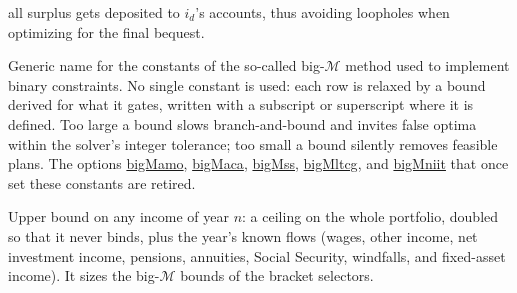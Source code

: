 \documentclass[fleqn,12pt]{report}
\newcommand{\code}[1]{\url{#1}}
\begin{document}
\begin{description}[leftmargin=4em,style=multiline]
	all surplus gets deposited to $i_d$'s accounts,
	thus avoiding loopholes when optimizing for the final bequest.
\item[$\mathcal{M}$]
	Generic name for the constants of the so-called big-$\mathcal{M}$ method used to implement
	binary constraints. No single constant is used: each row is relaxed by a bound derived for
	what it gates, written with a subscript or superscript where it is defined.
	Too large a bound slows branch-and-bound and invites false optima within the solver's
	integer tolerance; too small a bound silently removes feasible plans.
	The options \code{bigMamo}, \code{bigMaca}, \code{bigMss}, \code{bigMltcg}, and
	\code{bigMniit} that once set these constants are retired.
\item[$\bar{\mathcal{C}}_n$]
	Upper bound on any income of year $n$: a ceiling on the whole portfolio, doubled so that it
	never binds, plus the year's known flows (wages, other income, net investment income,
	pensions, annuities, Social Security, windfalls, and fixed-asset income).
	It sizes the big-$\mathcal{M}$ bounds of the bracket selectors.
\end{description}
\end{document}

